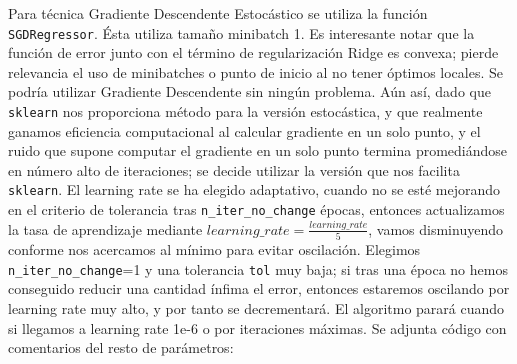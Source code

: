\documentclass[11pt,a4paper]{article}
\theoremstyle{definition}
\begin{document}
	Para técnica Gradiente Descendente Estocástico se utiliza la función \texttt{SGDRegressor}. Ésta utiliza tamaño minibatch 1. Es interesante notar que la función de error junto con el término de regularización Ridge es convexa; pierde relevancia el uso de minibatches o punto de inicio al no tener óptimos locales. Se podría utilizar Gradiente Descendente sin ningún problema. Aún así, dado que \texttt{sklearn} nos proporciona método para la versión estocástica, y que realmente ganamos eficiencia computacional al calcular gradiente en un solo punto, y el ruido que supone computar el gradiente en un solo punto termina promediándose en número alto de iteraciones; se decide utilizar la versión que nos facilita \texttt{sklearn}. El learning rate se ha elegido adaptativo, cuando no se esté mejorando en el criterio de tolerancia tras \texttt{n\_iter\_no\_change} épocas, entonces actualizamos la tasa de aprendizaje mediante $learning\_rate =\frac{learning\_rate}{5}$, vamos disminuyendo conforme nos acercamos al mínimo para evitar oscilación. Elegimos \texttt{n\_iter\_no\_change}=1 y una tolerancia \texttt{tol} muy baja; si tras una época no hemos conseguido reducir una cantidad ínfima el error, entonces estaremos oscilando por learning rate muy alto, y por tanto se decrementará. El algoritmo parará cuando si llegamos a learning rate 1e-6 o por iteraciones máximas. Se adjunta código con comentarios del resto de parámetros:%
\end{document}
